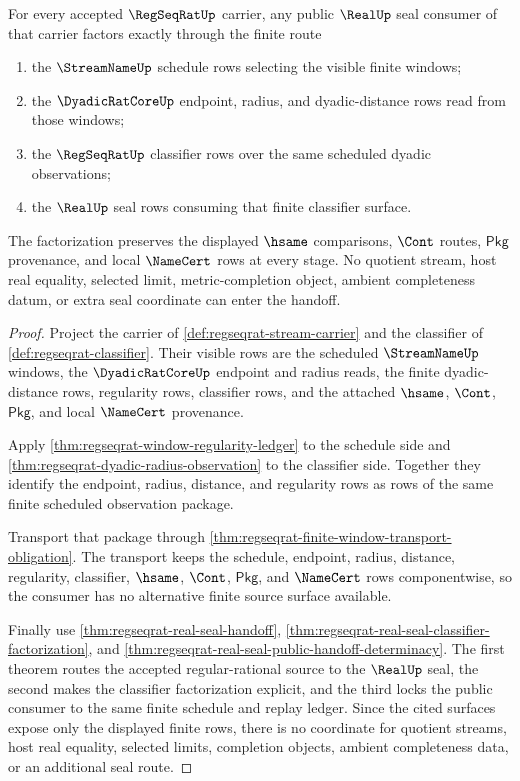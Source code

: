 \begin{theorem}
\label{thm:regseqrat-streamname-dyadic-real-handoff-exactness}
For every accepted $\RegSeqRatUp$ carrier, any public $\RealUp$ seal consumer
of that carrier factors exactly through the finite route
\begin{enumerate}
\item the $\StreamNameUp$ schedule rows selecting the visible finite windows;
\item the $\DyadicRatCoreUp$ endpoint, radius, and dyadic-distance rows read
from those windows;
\item the $\RegSeqRatUp$ classifier rows over the same scheduled dyadic
observations;
\item the $\RealUp$ seal rows consuming that finite classifier surface.
\end{enumerate}
The factorization preserves the displayed $\hsame$ comparisons, $\Cont$
routes, $\mathsf{Pkg}$ provenance, and local $\NameCert$ rows at every stage.
No quotient stream, host real equality, selected limit, metric-completion
object, ambient completeness datum, or extra seal coordinate can enter the
handoff.
\end{theorem}
\begin{proof}
Project the carrier of \autoref{def:regseqrat-stream-carrier} and the
classifier of \autoref{def:regseqrat-classifier}. Their visible rows are the
scheduled $\StreamNameUp$ windows, the $\DyadicRatCoreUp$ endpoint and radius
reads, the finite dyadic-distance rows, regularity rows, classifier rows,
and the attached $\hsame$, $\Cont$, $\mathsf{Pkg}$, and local $\NameCert$
provenance.

Apply \autoref{thm:regseqrat-window-regularity-ledger} to the schedule side
and \autoref{thm:regseqrat-dyadic-radius-observation} to the classifier side.
Together they identify the endpoint, radius, distance, and regularity rows as
rows of the same finite scheduled observation package.

Transport that package through
\autoref{thm:regseqrat-finite-window-transport-obligation}. The transport
keeps the schedule, endpoint, radius, distance, regularity, classifier,
$\hsame$, $\Cont$, $\mathsf{Pkg}$, and $\NameCert$ rows componentwise, so the
consumer has no alternative finite source surface available.

Finally use \autoref{thm:regseqrat-real-seal-handoff},
\autoref{thm:regseqrat-real-seal-classifier-factorization}, and
\autoref{thm:regseqrat-real-seal-public-handoff-determinacy}. The first
theorem routes the accepted regular-rational source to the $\RealUp$ seal,
the second makes the classifier factorization explicit, and the third locks
the public consumer to the same finite schedule and replay ledger. Since the
cited surfaces expose only the displayed finite rows, there is no coordinate
for quotient streams, host real equality, selected limits, completion
objects, ambient completeness data, or an additional seal route.
\end{proof}

